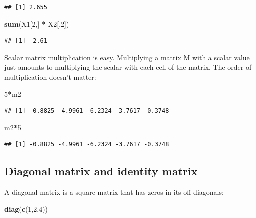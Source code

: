 \documentclass[12pt,]{krantz}
\newenvironment{Shaded}{\begin{snugshade}}{\end{snugshade}}
\newcommand{\DecValTok}[1]{\textcolor[rgb]{0.00,0.00,0.81}{#1}}
\newcommand{\KeywordTok}[1]{\textcolor[rgb]{0.13,0.29,0.53}{\textbf{#1}}}
\newcommand{\NormalTok}[1]{#1}
\newcommand{\OperatorTok}[1]{\textcolor[rgb]{0.81,0.36,0.00}{\textbf{#1}}}
\newcommand{\StringTok}[1]{\textcolor[rgb]{0.31,0.60,0.02}{#1}}
\begin{document}
\begin{verbatim}
## [1] 2.655
\end{verbatim}

\begin{Shaded}
\begin{Highlighting}[]
\KeywordTok{sum}\NormalTok{(X1[}\DecValTok{2}\NormalTok{,] }\OperatorTok{*}\StringTok{ }\NormalTok{X2[,}\DecValTok{2}\NormalTok{])}
\end{Highlighting}
\end{Shaded}

\begin{verbatim}
## [1] -2.61
\end{verbatim}

Scalar matrix multiplication is easy. Multiplying a matrix M with a scalar value just amounts to multiplying the scalar with each cell of the matrix. The order of multiplication doesn't matter:

\begin{Shaded}
\begin{Highlighting}[]
\DecValTok{5}\OperatorTok{*}\NormalTok{m2}
\end{Highlighting}
\end{Shaded}

\begin{verbatim}
## [1] -0.8825 -4.9961 -6.2324 -3.7617 -0.3748
\end{verbatim}

\begin{Shaded}
\begin{Highlighting}[]
\NormalTok{m2}\OperatorTok{*}\DecValTok{5}
\end{Highlighting}
\end{Shaded}

\begin{verbatim}
## [1] -0.8825 -4.9961 -6.2324 -3.7617 -0.3748
\end{verbatim}

\hypertarget{diagonal-matrix-and-identity-matrix}{%
\subsection{Diagonal matrix and identity matrix}\label{diagonal-matrix-and-identity-matrix}}

A diagonal matrix is a square matrix that has zeros in its off-diagonals:

\begin{Shaded}
\begin{Highlighting}[]
\KeywordTok{diag}\NormalTok{(}\KeywordTok{c}\NormalTok{(}\DecValTok{1}\NormalTok{,}\DecValTok{2}\NormalTok{,}\DecValTok{4}\NormalTok{))}
\end{Highlighting}
\end{Shaded}
\end{document}

